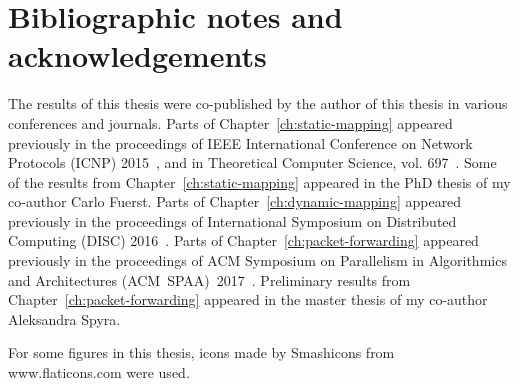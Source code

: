 \section{Bibliographic notes and acknowledgements}

The results of this thesis were co-published by the author of this thesis in various conferences and journals.
Parts of Chapter~\ref{ch:static-mapping} appeared previously in the proceedings of IEEE International Conference on Network Protocols (ICNP) 2015~\cite{my-icnp},
and in Theoretical Computer Science, vol. 697~\cite{my-tcs}.
Some of the results from Chapter~\ref{ch:static-mapping} appeared in the PhD thesis of my co-author Carlo Fuerst.
Parts of Chapter~\ref{ch:dynamic-mapping} appeared previously in the proceedings of International Symposium on Distributed Computing (DISC) 2016~\cite{my-disc}.
Parts of Chapter~\ref{ch:packet-forwarding} appeared previously in the proceedings of ACM Symposium on Parallelism in Algorithmics and Architectures (ACM~SPAA)~2017~\cite{my-spaa}.
Preliminary results from Chapter~\ref{ch:packet-forwarding} appeared in the master thesis of my co-author Aleksandra Spyra.

For some figures in this thesis, icons made by Smashicons from www.flaticons.com were used.